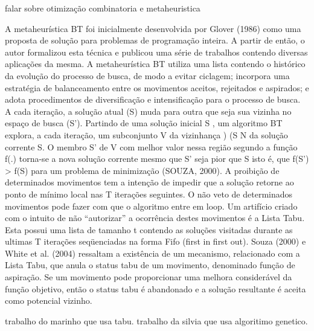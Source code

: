 \documentclass{abntpuc}
\begin{document}
%
%
%





	falar sobre otimização combinatoria e metaheuristica



		A metaheurística BT foi inicialmente desenvolvida por Glover (1986) como uma proposta de
	solução para problemas de programação inteira. A partir de então, o autor formalizou esta
	técnica e publicou uma série de trabalhos contendo diversas aplicações da mesma. A
	metaheurística BT utiliza uma lista contendo o histórico da evolução do processo de busca, de
	modo a evitar ciclagem; incorpora uma estratégia de balanceamento entre os movimentos
	aceitos, rejeitados e aspirados; e adota procedimentos de diversificação e intensificação para o
	processo de busca. A cada iteração, a solução atual (S) muda para outra que seja sua vizinha no espaço de busca
	(S’). Partindo de uma solução inicial
		S , um algoritmo BT explora, a cada iteração, um
	subconjunto V da vizinhança  ) (S N da solução corrente S. O membro S’ de V com melhor
	valor nessa região segundo a função f(.) torna-se a nova solução corrente mesmo que S’ seja
	pior que S isto é, que f(S’) > f(S) para um problema de minimização (SOUZA, 2000).
	A proibição de determinados movimentos tem a intenção de impedir que a solução retorne ao
	ponto de mínimo local nas T iterações seguintes. O não veto de determinados movimentos
	pode fazer com que o algoritmo entre em loop. Um artifício criado com o intuito de não
	“autorizar” a ocorrência destes movimentos é a Lista Tabu. Esta possui uma lista de tamanho t
	contendo as soluções visitadas durante as ultimas T iterações seqüenciadas na forma Fifo (first
	in first out).
	Souza (2000) e White et al. (2004) ressaltam a existência de um mecanismo, relacionado com
	a Lista Tabu, que anula o status tabu de um movimento, denominado função de aspiração. Se
	um movimento pode proporcionar uma melhora considerável da função objetivo, então o
	status tabu é abandonado e a solução resultante é aceita como potencial vizinho.

	




trabalho do marinho que usa tabu.
trabalho da silvia que usa algoritimo genetico.


%

%

%


%
\end{document}
